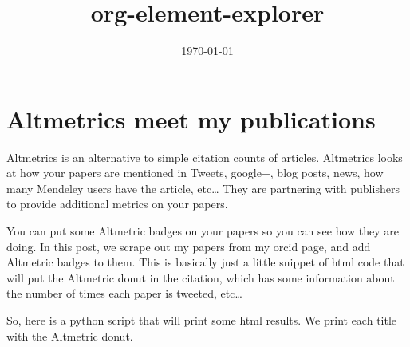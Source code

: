 \documentclass[11pt]{article}
\date{\today}
\title{org-element-explorer}
\begin{document}
\section{Altmetrics meet my publications}
\label{sec-1}
Altmetrics is an alternative to simple citation counts of articles. Altmetrics looks at how your papers are mentioned in Tweets, google+, blog posts, news, how many Mendeley users have the article, etc\ldots{} They are partnering with publishers to provide additional metrics on your papers.

You can put some Altmetric badges on your papers so you can see how they are doing. In this post, we scrape out my papers from my orcid page, and add Altmetric badges to them. This is basically just a little snippet of html code that will put the Altmetric donut in the citation, which has some information about the number of times each paper is tweeted, etc\ldots{}

So, here is a python script that will print some html results. We print each title with the Altmetric donut.
\end{document}
